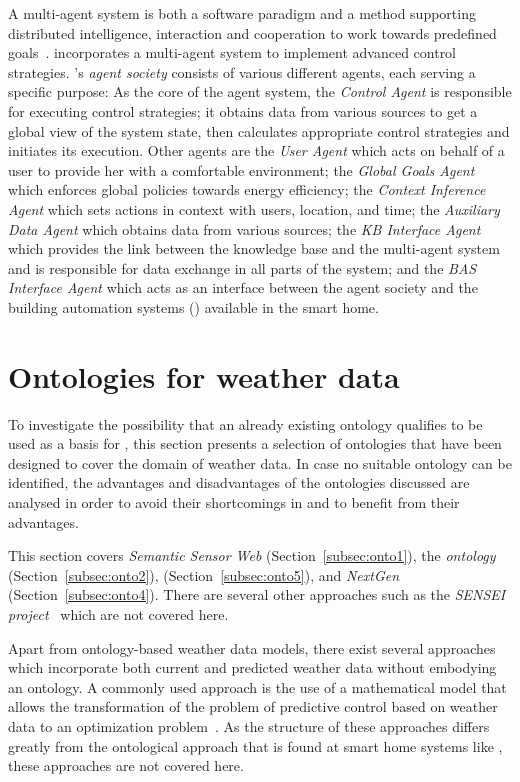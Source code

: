 A multi-agent system is both a software paradigm and a method supporting distributed intelligence, interaction and cooperation to work towards predefined goals~\cite{MultiAgentSystems}. \thinkhome incorporates a multi-agent system to implement advanced control strategies. \thinkhome's \emph{agent society} consists of various different agents, each serving a specific purpose: As the core of the agent system, the \emph{Control Agent} is responsible for executing control strategies; it obtains data from various sources to get a global view of the system state, then calculates appropriate control strategies and initiates its execution. Other agents are the \emph{User Agent} which acts on behalf of a user to provide her with a comfortable environment; the \emph{Global Goals Agent} which enforces global policies towards energy efficiency; the \emph{Context Inference Agent} which sets actions in context with users, location, and time; the \emph{Auxiliary Data Agent} which obtains data from various sources;
the \emph{KB Interface Agent} which provides the link between the knowledge base and the multi-agent system and is responsible for data exchange in all parts of the system; and the \emph{BAS Interface Agent} which acts as an interface between the agent society and the building automation systems () available in the smart home.

\section{Ontologies for weather data}
\label{sec:weather_ontologies}

To investigate the possibility that an already existing ontology qualifies to be used as a basis for \smarthomeweather, this section presents a selection of ontologies that have been designed to cover the domain of weather data. In case no suitable ontology can be identified, the advantages and disadvantages of the ontologies discussed are analysed in order to avoid their shortcomings in \smarthomeweather and to benefit from their advantages.

This section covers \emph{Semantic Sensor Web} (Section~\ref{subsec:onto1}), the \emph{ ontology} (Section~\ref{subsec:onto2}), \emph{} (Section~\ref{subsec:onto5}), and \emph{NextGen} (Section~\ref{subsec:onto4}). There are several other approaches such as the \emph{SENSEI project}~\cite{sensei} which are not covered here.

Apart from ontology-based weather data models, there exist several approaches which incorporate both current and predicted weather data without embodying an ontology. A commonly used approach is the use of a mathematical model that allows the transformation of the problem of predictive control based on weather data to an optimization problem~\cite{NonOntologicalApproach1,NonOntologicalApproach2}. As the structure of these approaches differs greatly from the ontological approach that is found at smart home systems like \thinkhome, these approaches are not covered here.

